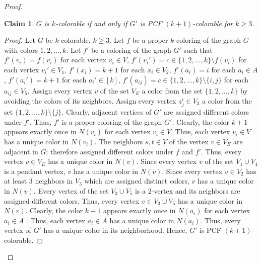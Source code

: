 \documentclass[11pt]{article}
\theoremstyle{plain}
\newtheorem{claim}{Claim}
\begin{document}
\begin{proof}
		\begin{claim} \label{(k)PCF_PEBG}
			$G$ is $k$-colorable if and only if $G'$ is PCF $(k+1)$-colorable for $k \geq 3$.
		\end{claim}
		\begin{proof}
			Let $G$ be $k$-colorable, $k\geq 3$. Let $f$ be a proper $k$-coloring of the graph $G$ with colors $1, 2, \ldots, k$. Let $f'$ be a coloring of the graph $G'$ such that $f'(v_i) = f(v_i)$ for each vertex $v_i \in V$, $f'(v_i') = c \in \{1, 2, \ldots, k\}\setminus f(v_i)$ for each vertex $v_i'\in V_1$, $f'(x_i) = k+1$ for each $x_i\in V_2$, $f'(a_i) = i$ for each $a_i\in A$, $f'(a_i') = k+1$ for each $a_i' \in [k]$, $f'(a_{ij}) = c \in \{1, 2, \ldots, k\}\setminus\{i, j\}$ for each $a_{ij}\in V_5$. Assign every vertex $v$ of the set $V_E$ a color from the set $\{1, 2, \ldots, k\}$ by avoiding the colors of its neighbors. Assign every vertex $z^i_j\in V_3$ a color from the set $\{1, 2, \ldots, k\}\setminus\{j\}$.
			Clearly, adjacent vertices of $G'$ are assigned different colors under $f'$. Thus, $f'$ is a proper coloring of the graph $G'$. 
			Clearly, the color $k+1$ appears exactly once in $N(v_i)$ for each vertex $v_i\in V$. Thus, each vertex $v_i\in V$ has a unique color in $N(v_i)$. The neighbors $s, t \in V$ of the vertex $v\in V_E$ are adjacent in $G$; therefore assigned different colors under $f$ and $f'$. Thus, every vertex $v\in V_E$ has a unique color in $N(v)$. Since every vertex $v$ of the set $V_1\cup V_4$ is a pendant vertex, $v$ has a unique color in $N(v)$. Since every vertex $v\in V_2$ has at least $3$ neighbors in $V_3$ which are assigned distinct colors, $v$ has a unique color in $N(v)$. Every vertex of the set $V_3\cup V_5$ is a $2$-vertex and its neighbors are assigned different colors. Thus, every vertex $v\in V_3\cup V_5$ has a unique color in $N(v)$.
			Clearly, the color $k+1$ appears exactly once in $N(a_i)$ for each vertex $a_i\in A$ . Thus, each vertex $a_i\in A$ has a unique color in $N(a_i)$. 
			Thus, every vertex of $G'$ has a unique color in its neighborhood. Hence, $G'$ is PCF $(k+1)$-colorable.
			
			\medskip
			

\end{proof}
\end{proof}
\end{document}
